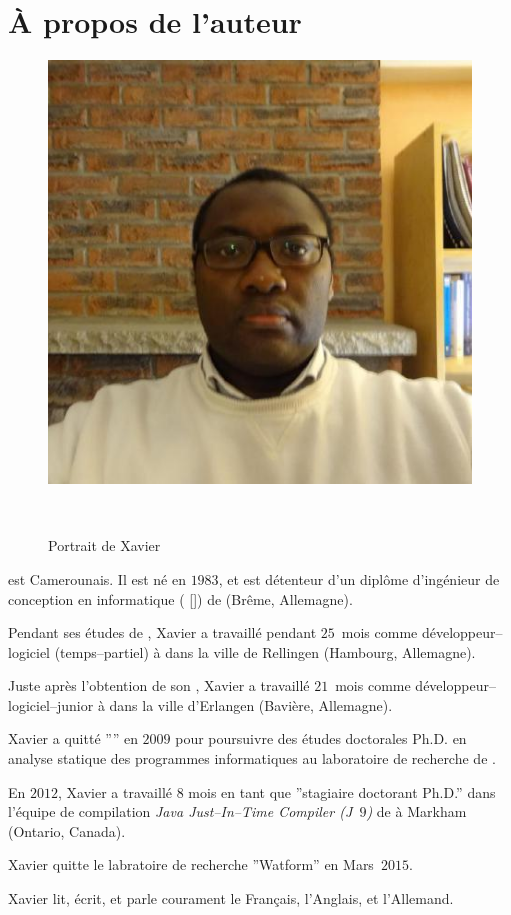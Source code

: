 \chapter*{\`A propos de l'auteur}\label{chap:biography}

\begin{figure}[!htpb]
\centering
\includegraphics[scale=0.63]{images/XavierNOUNDOU-2}
\caption{Portrait de Xavier}~\label{fig:xaviernoumbis}
\end{figure}

 est Camerounais.
Il est n\'e en $1983$, et est d\'etenteur d'un
dipl\^ome d'ing\'enieur de conception en informatique
(\emph{\diplominformatiker} [\diplinf]) de
 (Br\^eme, Allemagne).

Pendant ses \'etudes de \diplinf,
Xavier a travaill\'e pendant $25$~mois comme
d\'eveloppeur--logiciel (temps--partiel) \`a
\company{\bergmann} dans la ville de Rellingen
(Hambourg, Allemagne).

Juste apr\`es l'obtention de son \diplinf,
Xavier a travaill\'e $21$~mois comme d\'eveloppeur--logiciel--junior
\`a \company{\siemens} dans la ville d'Erlangen
(Bavi\`ere, Allemagne).

Xavier a quitt\'e ''\siemens'' en $2009$ pour poursuivre
des \'etudes doctorales Ph.D. en analyse statique des programmes
informatiques au laboratoire de recherche 
de .

En $2012$, Xavier a travaill\'e $8$ mois en tant
que ''stagiaire doctorant Ph.D.'' dans l'\'equipe
de compilation \emph{Java Just--In--Time Compiler (J~$9$)}
de  \`a Markham (Ontario, Canada).

Xavier quitte le labratoire de recherche ''Watform''
en Mars~$2015$.

Xavier lit, \'ecrit, et parle courament le Fran\c{c}ais,
l'Anglais, et l'Allemand.
